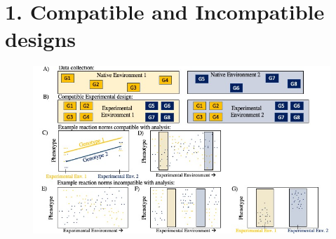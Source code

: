 \documentclass[11pt, oneside]{amsart}
\begin{document}
\renewcommand{\figurename}{Supplementary Figure}
\section{1. Compatible and Incompatible designs}
\renewcommand\thefigure{S1}
\begin{figure}[h]
\begin{center}
\includegraphics[width=6in]{Figs/IncompatibleDesigns.jpg}
\end{center}
\label{Fig: Compatible and Incompatible designs}

\end{figure}
\end{document}
